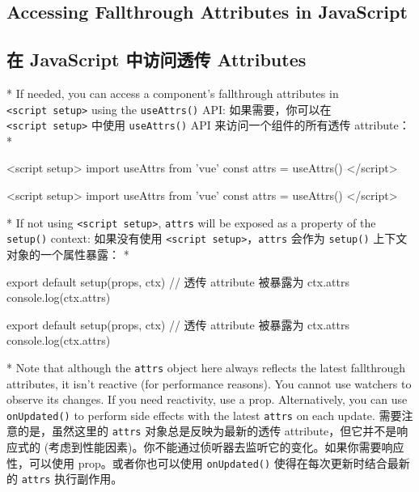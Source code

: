 \begin{paracol}{2}
\subsection{Accessing Fallthrough Attributes in JavaScript}
\switchcolumn
\subsection{在 JavaScript 中访问透传 Attributes}
\switchcolumn[0]*%
If needed, you can access a component's fallthrough attributes in
\texttt{\textless{}script\ setup\textgreater{}} using the
\texttt{useAttrs()} API:
\switchcolumn
如果需要，你可以在 \texttt{\textless{}script\ setup\textgreater{}}
中使用 \texttt{useAttrs()} API 来访问一个组件的所有透传 attribute：
\switchcolumn[0]*%
\begin{codeHtml}
<script setup>
import { useAttrs } from 'vue'
const attrs = useAttrs()
</script>
\end{codeHtml}
\switchcolumn
\begin{codeHtml}
<script setup>
import { useAttrs } from 'vue'
const attrs = useAttrs()
</script>
\end{codeHtml}
\switchcolumn[0]*%
If not using \texttt{\textless{}script\ setup\textgreater{}},
\texttt{attrs} will be exposed as a property of the \texttt{setup()}
context:
\switchcolumn
如果没有使用
\texttt{\textless{}script\ setup\textgreater{}}，\texttt{attrs} 会作为
\texttt{setup()} 上下文对象的一个属性暴露：
\switchcolumn[0]*%
\begin{codeJs}
export default {
  setup(props, ctx) {
    // 透传 attribute 被暴露为 ctx.attrs
    console.log(ctx.attrs)
  }
}
\end{codeJs}
\switchcolumn
\begin{codeJs}
export default {
  setup(props, ctx) {
    // 透传 attribute 被暴露为 ctx.attrs
    console.log(ctx.attrs)
  }
}
\end{codeJs}
\switchcolumn[0]*%
Note that although the \texttt{attrs} object here always reflects the
latest fallthrough attributes, it isn't reactive (for performance
reasons). You cannot use watchers to observe its changes. If you need
reactivity, use a prop. Alternatively, you can use \texttt{onUpdated()}
to perform side effects with the latest \texttt{attrs} on each update.
\switchcolumn
需要注意的是，虽然这里的 \texttt{attrs} 对象总是反映为最新的透传
attribute，但它并不是响应式的
(考虑到性能因素)。你不能通过侦听器去监听它的变化。如果你需要响应性，可以使用
prop。或者你也可以使用 \texttt{onUpdated()} 使得在每次更新时结合最新的
\texttt{attrs} 执行副作用。
\end{paracol}
